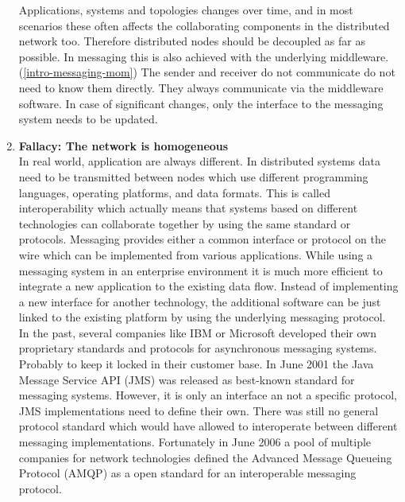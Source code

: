 \begin{enumerate}
{        Applications, systems and topologies changes over time, and in most
        scenarios these often affects the collaborating components in the
        distributed network too. Therefore distributed nodes should be decoupled as
        far as possible. In messaging this is also achieved with the underlying
        middleware.(\ref{intro-messaging-mom}) The sender and receiver do not
        communicate do not need to know them directly. They always communicate
        via the middleware software. In case of significant changes, only the
        interface to the messaging system needs to be updated. }
    \item{\textbf{Fallacy: The network is homogeneous}\hfill \\
        In real world, application are always different. In distributed systems
        data need to be transmitted between nodes which use different
        programming languages, operating platforms, and data formats.
        This is called interoperability  which actually means that
        systems based on different technologies can collaborate together by using
        the same standard or protocols. Messaging provides either a common
        interface or protocol on the wire which can be implemented from various
        applications. While using a messaging system in an
        enterprise environment it is much more efficient to integrate a new
        application to the existing data flow. Instead of implementing a new
        interface for another technology, the additional software can be just
        linked to the existing platform by using the underlying messaging
        protocol.\\

        In the past, several companies like IBM or Microsoft developed their own
        proprietary standards and protocols for asynchronous messaging systems.
        Probably to keep it locked in their customer base. In June 2001 the Java
        Message Service API (JMS) was released as best-known standard for
        messaging systems. However, it is only an interface an not a specific
        protocol, JMS implementations need to define their own. There was still
        no general protocol standard which would have allowed to interoperate
        between different messaging implementations. Fortunately in June 2006 a
        pool of multiple companies for network technologies defined the Advanced
        Message Queueing Protocol (AMQP) as a open standard for an interoperable
        messaging protocol. \cite{PrpAMQP}

    }
 
\end{enumerate}\cite{EIP03}

